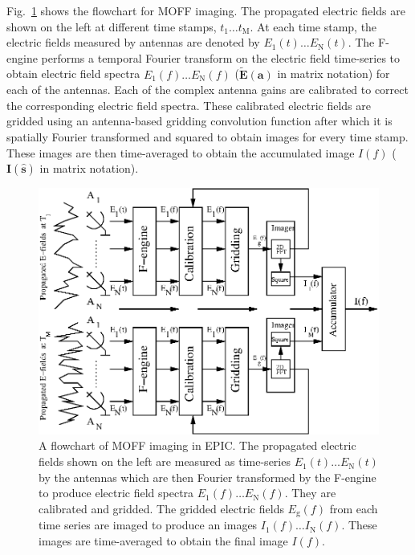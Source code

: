 \documentclass[a4paper,fleqn,usenatbib]{../mnras}
\begin{document}
Fig.~\ref{fig:MOFF-flowchart} shows the flowchart for MOFF imaging. The
propagated electric fields are shown on the left at different time stamps,
$t_1\ldots t_\textrm{M}$. At each time stamp, the electric fields measured by
antennas are denoted by $E_1(t)\ldots E_\textrm{N}(t)$. The F-engine performs a
temporal Fourier transform on the electric field time-series to obtain electric
field spectra $E_1(f)\ldots E_\textrm{N}(f)$ ($\widetilde{\mathbf{E}}(\mathbf{a})$ in matrix
notation) for each of the antennas. Each of the complex antenna gains are
calibrated to correct the corresponding electric field spectra. These calibrated
electric fields are gridded using an antenna-based gridding convolution function
after which it is spatially Fourier transformed and squared to obtain images
for every time stamp. These images are then time-averaged to obtain the
accumulated image $I(f)$ ($\mathbf{I}(\hat{\mathbf{s}})$ in matrix notation).
\begin{figure}
  \includegraphics[width=\columnwidth]{MOFF_flowchart.eps}
  \caption{A flowchart of MOFF imaging in EPIC. The propagated electric fields
    shown on the left are measured as time-series $E_1(t)\ldots E_\textrm{N}(t)$
    by the antennas which are then Fourier transformed by the F-engine to produce
    electric field spectra $E_1(f)\ldots E_\textrm{N}(f)$. They are calibrated and
    gridded. The gridded electric fields $E_\textrm{g}(f)$ from each time series
    are imaged to produce an images $I_1(f)\ldots I_\textrm{N}(f)$. These images
    are time-averaged to obtain the final image $I(f)$.}
  \label{fig:MOFF-flowchart}
\end{figure}
\end{document}
